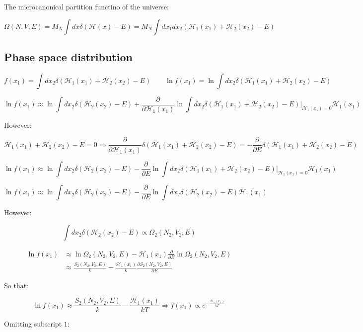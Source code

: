 	The microcanonical partition functino of the universe:

	$$\Omega(N, V, E) = M_N\int dx\delta(\mathcal{H}(x)-E) = M_N\int dx_1dx_2(\mathcal{H}_1(x_1) + \mathcal{H}_2(x_2) - E)$$

	\subsection{Phase space distribution}

	$$f(x_1) = \int dx_2\delta(\mathcal{H}_1(x_1)+\mathcal{H}_2(x_2) -E)\qquad \ln f(x_1) = \ln \int dx_2\delta(\mathcal{H}_1(x_1)+\mathcal{H}_2(x_2) -E)$$


	$$\ln f(x_1) \approx\ln\int dx_2\delta(\mathcal{H}_2(x_2)-E) + \frac{\partial}{\partial\mathcal{H}_1(x_1)}\ln\int dx_2\delta(\mathcal{H}_1(x_1) + \mathcal{H}_2(x_2) -E)|_{\mathcal{H}_1(x_1)=0}\mathcal{H}_1(x_1)$$

	However:

	$$\mathcal{H}_1(x_1) + \mathcal{H}_2(x_2) - E = 0\Rightarrow\frac{\partial}{\partial\mathcal{H}_1(x_1)}\delta(\mathcal{H}_1(x_1)+\mathcal{H}_2(x_2)-E) = -\frac{\partial}{\partial E}\delta(\mathcal{H}_1(x_1)+\mathcal{H}_2(x_2)-E)$$

	$$\ln f(x_1) \approx\ln\int dx_2\delta(\mathcal{H}_2(x_2)-E) - \frac{\partial}{\partial E}\ln\int dx_2\delta(\mathcal{H}_1(x_1) + \mathcal{H}_2(x_2)-E)|_{\mathcal{H}_1(x_1) = 0}\mathcal{H}_1(x_1)$$

	$$\ln f(x_1) \approx\ln\int dx_2\delta(\mathcal{H}_2(x_2) - E)-\frac{\partial}{\partial E}\ln\int dx_2\delta(\mathcal{H}_2(x_2) - E)\mathcal{H}_1(x_1)$$

	However:

	$$\int dx_2\delta(\mathcal{H}_2(x_2) - E) \propto\Omega_2(N_2, V_2, E)$$

	\begin{align*}
		\ln f(x_1) &\approx\ln\Omega_2(N_2, V_2, E) - \mathcal{H}_1(x_1)\frac{\partial}{\partial E}\ln\Omega_2(N_2, V_2, E)\\
							 &\approx\frac{S_2(N_2, V_2, E)}{k}-\frac{\mathcal{H}_1(x_1)}{k}\frac{\partial S_2(N_2, V_2, E)}{\partial E}
	\end{align*}

	So that:

	$$\ln f(x_1)\approx \frac{S_2(N_2, V_2, E)}{k}-\frac{\mathcal{H}_1(x_1)}{kT}\Rightarrow f(x_1)\propto e^{-\frac{\mathcal{H}_1(x_1)}{kT}}$$

	Omitting subscript $1$:

